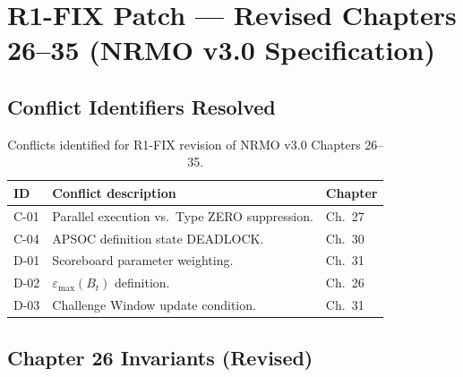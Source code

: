 
\chapter{R1-FIX Patch --- Revised Chapters 26--35
(NRMO v3.0 Specification)}
\label{ch:r1fix-patch}


\section{Conflict Identifiers Resolved}
\label{sec:r1fix-conflicts}

\begin{table}[ht]
\centering
\small
\begin{tabularx}{\linewidth}{lXl}
\toprule
\textbf{ID} & \textbf{Conflict description} & \textbf{Chapter} \\
\midrule
C-01 & Parallel execution vs.~Type ZERO suppression. & Ch.~27 \\
C-04 & APSOC definition state DEADLOCK. & Ch.~30 \\
D-01 & Scoreboard parameter weighting. & Ch.~31 \\
D-02 & $\varepsilon_{\max}(B_t)$ definition. & Ch.~26 \\
D-03 & Challenge Window update condition. & Ch.~31 \\
\bottomrule
\end{tabularx}
\caption[R1-FIX conflicts]{Conflicts identified for R1-FIX revision
of NRMO v3.0 Chapters 26--35.}
\label{tab:r1fix-conflicts}
\end{table}

\section{Chapter 26 Invariants (Revised)}
\label{sec:r1fix-invariants}

